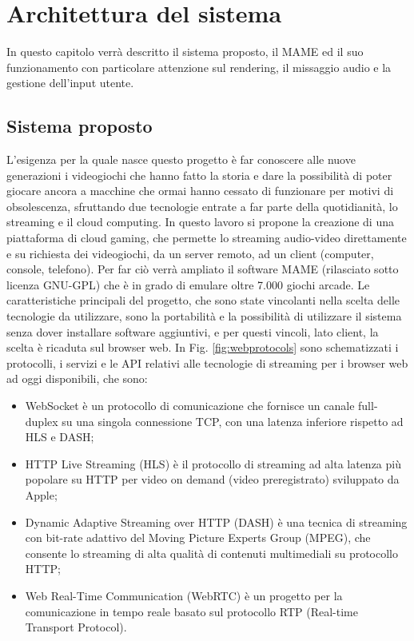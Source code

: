 %
%

\chapter{Architettura del sistema}
In questo capitolo verrà descritto il sistema proposto, il MAME ed il suo funzionamento con particolare attenzione sul rendering, il missaggio audio e la gestione dell'input utente.

\section{Sistema proposto}
L'esigenza per la quale nasce questo progetto è far conoscere alle nuove generazioni i videogiochi che hanno fatto la storia e dare la possibilità di poter giocare ancora a macchine che ormai hanno cessato di funzionare per motivi di obsolescenza, sfruttando due tecnologie entrate a far parte della quotidianità, lo streaming e il cloud computing. In questo lavoro si propone la creazione di una piattaforma di cloud gaming, che permette lo streaming audio-video direttamente e su richiesta dei videogiochi, da un server remoto, ad un client (computer, console, telefono). Per far ciò verrà ampliato il software MAME (rilasciato sotto licenza GNU-GPL) che è in grado di emulare oltre 7.000 giochi arcade. Le caratteristiche principali del progetto, che sono state vincolanti nella scelta delle tecnologie da utilizzare, sono la portabilità e la possibilità di utilizzare il sistema senza dover installare software aggiuntivi, e per questi vincoli, lato client, la scelta è ricaduta sul browser web. In Fig. \ref{fig:webprotocols} sono schematizzati i protocolli, i servizi e le API relativi alle tecnologie di streaming per i browser web ad oggi disponibili\cite{Audio_and_video_delivery}, che sono:

\begin{itemize}
	\item WebSocket è un protocollo di comunicazione che fornisce un canale full-duplex su una singola connessione TCP, con una latenza inferiore rispetto ad HLS e DASH;
	\item HTTP Live Streaming (HLS) è il protocollo di streaming ad alta latenza più popolare su HTTP per video on demand (video preregistrato) sviluppato da Apple;
	\item Dynamic Adaptive Streaming over HTTP (DASH) è una tecnica di streaming con bit-rate adattivo del Moving Picture Experts Group (MPEG), che consente lo streaming di alta qualità di contenuti multimediali su protocollo HTTP;
	\item Web Real-Time Communication (WebRTC) è un progetto per la comunicazione in tempo reale basato sul protocollo RTP (Real-time Transport Protocol)\cite{High_Performance_Browser_Networking}.
\end{itemize}

